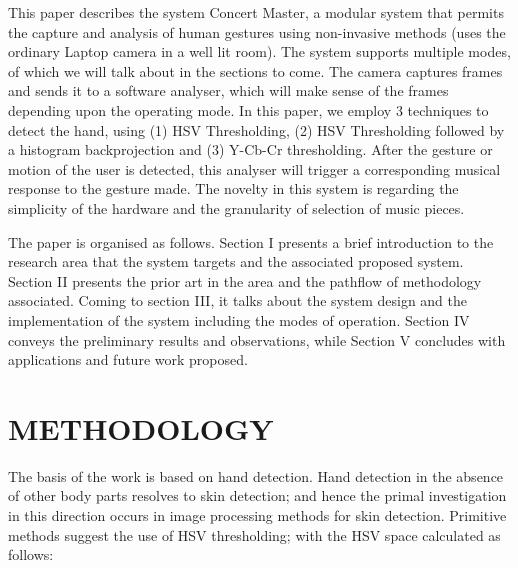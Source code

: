 \documentclass[letterpaper, 11 pt, twoside, conference]{ieeeconf}
\begin{document}
This paper describes the system Concert Master, a modular system that permits the capture and analysis of human gestures using non-invasive methods (uses the ordinary Laptop camera in a well lit room).
The system supports multiple modes, of which we will talk about in the sections to come. The camera
captures frames and sends it to a software analyser, which will make sense of the frames depending
upon the operating mode. In this paper, we employ 3 techniques to detect the hand, using (1) HSV Thresholding,
(2) HSV Thresholding followed by a histogram backprojection and (3) Y-Cb-Cr thresholding. After the gesture or motion of the user is detected, this analyser will
trigger a corresponding musical response to the gesture made. The novelty in this system is regarding the
simplicity of the hardware and the granularity of selection of music pieces.

The paper is organised as follows. Section I presents a brief introduction to the research area that the system targets and
the associated proposed system. Section II presents the prior art in the area and the
pathflow of methodology associated. Coming to section III, it talks about the system design
and the implementation of the system including the modes of operation. Section IV conveys the
preliminary results and observations, while Section V concludes with applications and future
work proposed.

\section{METHODOLOGY}
\label{sec:pagestyle}

The basis of the work is based on hand detection. Hand detection in the absence of
other body parts resolves to skin detection; and hence the primal investigation in this
direction occurs in image processing methods for skin detection. Primitive methods
suggest the use of HSV thresholding; with the HSV space calculated as follows:
\end{document}
